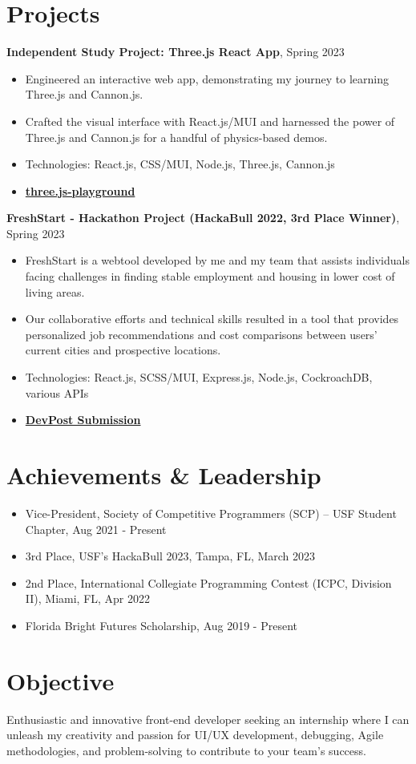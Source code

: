 \documentclass[a4paper,10pt]{article}
\begin{document}
\section*{Projects}
\raggedright\textbf{Independent Study Project: Three.js React App}, Spring 2023
\begin{itemize}
    \item Engineered an interactive web app, demonstrating my journey to learning Three.js and Cannon.js.
    \item Crafted the visual interface with React.js/MUI and harnessed the power of Three.js and Cannon.js for a handful of physics-based demos.
    \item Technologies: React.js, CSS/MUI, Node.js, Three.js, Cannon.js
    \item \textbf{\href{https://github.com/Jubbery/three.js-playground/}{three.js-playground}}
\end{itemize}

\raggedright\textbf{FreshStart - Hackathon Project (HackaBull 2022, 3rd Place Winner)}, Spring 2023
\begin{itemize}
    \item FreshStart is a webtool developed by me and my team that assists individuals facing challenges in finding stable employment and housing in lower cost of living areas.
    \item Our collaborative efforts and technical skills resulted in a tool that provides personalized job recommendations and cost comparisons between users' current cities and prospective locations.
    \item Technologies: React.js, SCSS/MUI, Express.js, Node.js, CockroachDB, various APIs
    \item \textbf{\href{https://devpost.com/software/freshstart/}{DevPost Submission}}
\end{itemize}

\section*{Achievements \& Leadership}
\begin{itemize}
    \item Vice-President, Society of Competitive Programmers (SCP) – USF Student Chapter, Aug 2021 - Present
    \item 3rd Place, USF's HackaBull 2023, Tampa, FL, March 2023
    \item 2nd Place, International Collegiate Programming Contest (ICPC, Division II), Miami, FL, Apr 2022
    \item Florida Bright Futures Scholarship, Aug 2019 - Present
\end{itemize}

\section*{Objective}
Enthusiastic and innovative front-end developer seeking an internship where I can unleash my creativity and passion for UI/UX development, debugging, Agile methodologies, and problem-solving to contribute to your team's success.
\end{document}
